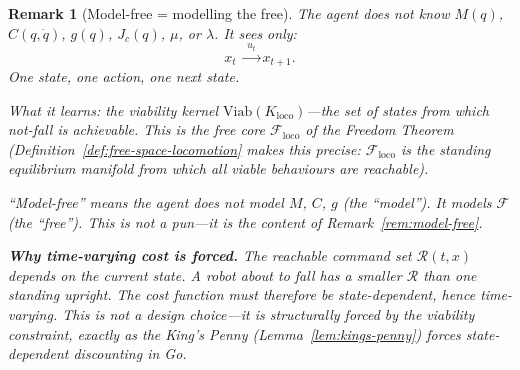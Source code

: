 \documentclass[11pt,a4paper]{article}
\newtheorem{remark}[theorem]{Remark}
\newcommand{\cF}{\mathcal{F}}
\newcommand{\cR}{\mathcal{R}}
\begin{document}
\begin{remark}[Model-free = modelling the free]
\label{rem:model-free-locomotion}
The agent does \emph{not} know
$M(q)$, $C(q,\dot{q})$, $g(q)$,
$J_c(q)$, $\mu$, or $\lambda$.
It sees only:
\[
  x_t
  \;\xrightarrow{\;u_t\;}
  x_{t+1}.
\]
One state, one action, one next state.

What it learns:
the viability kernel
$\mathrm{Viab}(K_{\mathrm{loco}})$---the set of states
from which not-fall is achievable.
This \emph{is} the free core $\cF_{\mathrm{loco}}$
of the Freedom Theorem
(Definition~\ref{def:free-space-locomotion}
makes this precise:
$\cF_{\mathrm{loco}}$ is the standing equilibrium
manifold from which all viable behaviours
are reachable).

``Model-free'' means the agent does not model
$M$, $C$, $g$ (the ``model'').
It models $\cF$ (the ``free'').
This is not a pun---it is the content of
Remark~\ref{rem:model-free}.

\medskip\noindent
\textbf{Why time-varying cost is forced.}\;
The reachable command set $\cR(t,x)$ depends on the
current state.
A robot about to fall has a smaller $\cR$ than one
standing upright.
The cost function must therefore be state-dependent,
hence time-varying.
This is not a design choice---it is structurally forced
by the viability constraint,
exactly as the King's Penny
(Lemma~\ref{lem:kings-penny})
forces state-dependent discounting in Go.
\end{remark}

\end{document}
